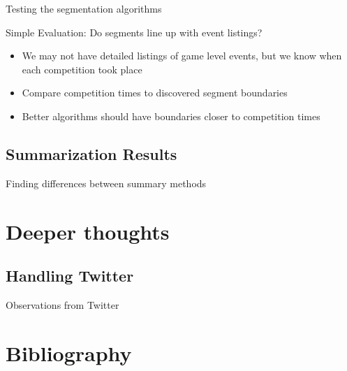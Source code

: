 \documentclass[compress]{beamer}
\begin{document}
\begin{frame}{Testing the segmentation algorithms}
\begin{block}{Simple Evaluation: Do segments line up with event listings?}
\begin{itemize}
\item We may not have detailed listings of game level events, but we know when
each competition took place
\item Compare competition times to discovered segment boundaries
\item Better algorithms should have boundaries closer to competition times
\end{itemize}
\end{block}

\begin{table}[h!t!b!]
\center
\tiny

\caption{Total Absolute Error between nearest discovered segment and known
competition times}
\end{table}

\end{frame}

\subsection{Summarization Results}
\begin{frame}{Finding differences between summary methods}
\end{frame}

\section{Deeper thoughts}
\subsection{Handling Twitter}
\begin{frame}{Observations from Twitter}
\end{frame}

\section{Bibliography}

\begin{frame}


\end{frame}
\end{document}
